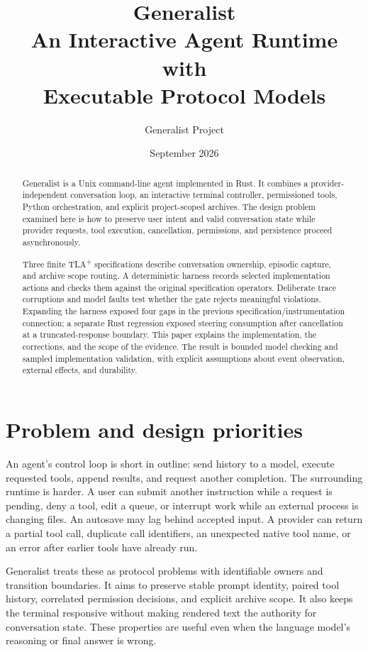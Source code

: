 \documentclass[10pt,letterpaper]{article}
\title{\vspace{-1.5em}\textcolor{ink}{\Huge Generalist}\\[0.6em]
\Large An Interactive Agent Runtime with\\Executable Protocol Models}
\author{Generalist Project}
\date{September 2026}
\newcommand{\tla}{TLA\textsuperscript{+}}
\begin{document}
\maketitle
\thispagestyle{fancy}
\begin{abstract}
Generalist is a Unix command-line agent implemented in Rust. It combines a
provider-independent conversation loop, an interactive terminal controller,
permissioned tools, Python orchestration, and explicit project-scoped archives.
The design problem examined here is how to preserve user intent and valid
conversation state while provider requests, tool execution, cancellation,
permissions, and persistence proceed asynchronously.

Three finite \tla{} specifications describe conversation ownership, episodic
capture, and archive scope routing. A deterministic harness records selected
implementation actions and checks them against the original specification
operators. Deliberate trace corruptions and model faults test whether the gate
rejects meaningful violations. Expanding the harness exposed four gaps in the
previous specification/instrumentation connection; a separate Rust regression
exposed steering consumption after cancellation at a truncated-response
boundary. This paper explains the implementation, the corrections, and the
scope of the evidence. The result is bounded model checking and sampled
implementation validation, with explicit assumptions about event observation,
external effects, and durability.
\end{abstract}

\section{Problem and design priorities}
An agent's control loop is short in outline: send history to a model, execute
requested tools, append results, and request another completion. The surrounding
runtime is harder. A user can submit another instruction while a request is
pending, deny a tool, edit a queue, or interrupt work while an external process
is changing files. An autosave may lag behind accepted input. A provider can
return a partial tool call, duplicate call identifiers, an unexpected native
tool name, or an error after earlier tools have already run.

Generalist treats these as protocol problems with identifiable owners and
transition boundaries. It aims to preserve stable prompt identity, paired tool
history, correlated permission decisions, and explicit archive scope. It also
keeps the terminal responsive without making rendered text the authority for
conversation state. These properties are useful even when the language model's
reasoning or final answer is wrong.
\end{document}

